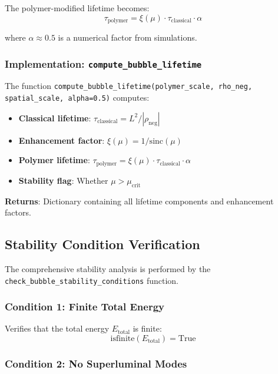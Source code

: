 The polymer-modified lifetime becomes:
\begin{equation}
\tau_{\text{polymer}} = \xi(\mu) \cdot \tau_{\text{classical}} \cdot \alpha
\end{equation}

where $\alpha \approx 0.5$ is a numerical factor from simulations.

\subsubsection{Implementation: \texttt{compute\_bubble\_lifetime}}

The function \texttt{compute\_bubble\_lifetime(polymer\_scale, rho\_neg, spatial\_scale, alpha=0.5)} computes:

\begin{itemize}
\item \textbf{Classical lifetime}: $\tau_{\text{classical}} = L^2/|\rho_{\text{neg}}|$
\item \textbf{Enhancement factor}: $\xi(\mu) = 1/\text{sinc}(\mu)$
\item \textbf{Polymer lifetime}: $\tau_{\text{polymer}} = \xi(\mu) \cdot \tau_{\text{classical}} \cdot \alpha$
\item \textbf{Stability flag}: Whether $\mu > \mu_{\text{crit}}$
\end{itemize}

\textbf{Returns}: Dictionary containing all lifetime components and enhancement factors.

\subsection{Stability Condition Verification}

The comprehensive stability analysis is performed by the \texttt{check\_bubble\_stability\_conditions} function.

\subsubsection{Condition 1: Finite Total Energy}

Verifies that the total energy $E_{\text{total}}$ is finite:
\begin{equation}
\text{isfinite}(E_{\text{total}}) = \text{True}
\end{equation}

\subsubsection{Condition 2: No Superluminal Modes}

